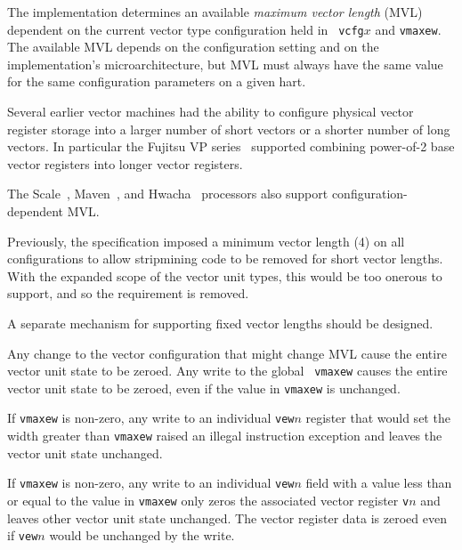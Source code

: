 The implementation determines an available {\em maximum vector length}
(MVL) dependent on the current vector type configuration held in {\tt
  vcfg}$x$ and {\tt vmaxew}.  The available MVL depends on the
configuration setting and on the implementation's microarchitecture,
but MVL must always have the same value for the same configuration
parameters on a given hart.

\begin{commentary}
  Several earlier vector machines had the ability to configure
  physical vector register storage into a larger number of short
  vectors or a shorter number of long vectors. In particular the
  Fujitsu VP series~\cite{vp200} supported combining power-of-2 base
  vector registers into longer vector registers.

  The Scale~\cite{}, Maven~\cite{}, and Hwacha~\cite{} processors also
  support configuration-dependent MVL.
\end{commentary}

\begin{commentary}
  Previously, the specification imposed a minimum vector length (4) on
  all configurations to allow stripmining code to be removed for short
  vector lengths.  With the expanded scope of the vector unit types,
  this would be too onerous to support, and so the requirement is removed.
\end{commentary}

\begin{discussion}
  A separate mechanism for supporting fixed vector lengths should be
  designed.
\end{discussion}

Any change to the vector configuration that might change MVL cause the
entire vector unit state to be zeroed.  Any write to the global {\tt
  vmaxew} causes the entire vector unit state to be zeroed, even if
the value in {\tt vmaxew} is unchanged.

If {\tt vmaxew} is non-zero, any write to an individual {\tt vew}$n$
register that would set the width greater than {\tt vmaxew} raised an
illegal instruction exception and leaves the vector unit state
unchanged.

If {\tt vmaxew} is non-zero, any write to an individual {\tt vew}$n$
field with a value less than or equal to the value in {\tt vmaxew}
only zeros the associated vector register {\tt v}$n$ and leaves other
vector unit state unchanged.  The vector register data is zeroed even
if {\tt vew}$n$ would be unchanged by the write.

